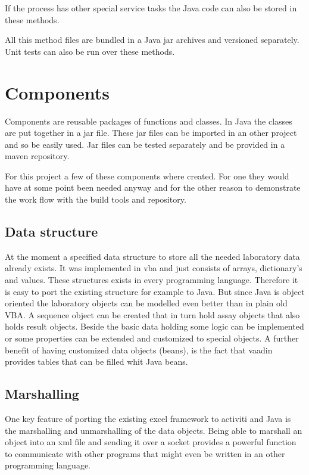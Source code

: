 \documentclass[paper=a4,twoside=false,BCOR=0mm,DIV=calc,fontsize=12pt]{scrartcl}
\begin{document}
If the process has other special service tasks the Java code can also be stored in these methods. 

All this method files are bundled in a Java jar archives and versioned separately. Unit tests can also be run over these methods.


\section{Components}
Components are reusable packages of functions and classes. In Java the classes are put together in a jar file. These jar files can be imported in an other project and so be easily used.
Jar files can be tested separately and be provided in a maven repository.

For this project a few of these components where created. For one they would have at some point been needed anyway and for the other reason to
demonstrate the work flow with the build tools and repository.



\subsection{Data structure}
At the moment a specified data structure to store all the needed laboratory data already exists. It was implemented in vba and just consists of
arrays, dictionary's and values. These structures exists in every programming language. Therefore it is easy to port the existing structure for
example to Java. But since Java is object oriented the laboratory objects can be modelled even better than in plain old VBA. A sequence object can be
created that in turn hold assay objects that also holds result objects. Beside the basic data holding some logic can be implemented or some properties
can be extended and customized to special objects. A further benefit of having customized data objects (beans), is the fact that vaadin provides
tables that can be filled whit Java beans.




\subsection{Marshalling}
One key feature of porting the existing excel framework to activiti and Java is the marshalling and unmarshalling of the data objects.
Being able to marshall an object into an xml file and sending it over a socket provides a powerful function to communicate with other programs that
might even be written in an other programming language.
\end{document}
